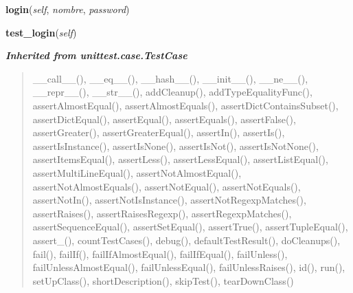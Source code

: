     \label{test:UsuarioTestCase:login}

    \vspace{0.5ex}

\hspace{.8\funcindent}\begin{boxedminipage}{\funcwidth}

    \raggedright \textbf{login}(\textit{self}, \textit{nombre}, \textit{password})

\setlength{\parskip}{2ex}
\setlength{\parskip}{1ex}
    \end{boxedminipage}

    \label{test:UsuarioTestCase:test_login}

    \vspace{0.5ex}

\hspace{.8\funcindent}\begin{boxedminipage}{\funcwidth}

    \raggedright \textbf{test\_login}(\textit{self})

\setlength{\parskip}{2ex}
\setlength{\parskip}{1ex}
    \end{boxedminipage}


\large{\textbf{\textit{Inherited from unittest.case.TestCase}}}

\begin{quote}
\_\_call\_\_(), \_\_eq\_\_(), \_\_hash\_\_(), \_\_init\_\_(), \_\_ne\_\_(), \_\_repr\_\_(), \_\_str\_\_(), addCleanup(), addTypeEqualityFunc(), assertAlmostEqual(), assertAlmostEquals(), assertDictContainsSubset(), assertDictEqual(), assertEqual(), assertEquals(), assertFalse(), assertGreater(), assertGreaterEqual(), assertIn(), assertIs(), assertIsInstance(), assertIsNone(), assertIsNot(), assertIsNotNone(), assertItemsEqual(), assertLess(), assertLessEqual(), assertListEqual(), assertMultiLineEqual(), assertNotAlmostEqual(), assertNotAlmostEquals(), assertNotEqual(), assertNotEquals(), assertNotIn(), assertNotIsInstance(), assertNotRegexpMatches(), assertRaises(), assertRaisesRegexp(), assertRegexpMatches(), assertSequenceEqual(), assertSetEqual(), assertTrue(), assertTupleEqual(), assert\_(), countTestCases(), debug(), defaultTestResult(), doCleanups(), fail(), failIf(), failIfAlmostEqual(), failIfEqual(), failUnless(), failUnlessAlmostEqual(), failUnlessEqual(), failUnlessRaises(), id(), run(), setUpClass(), shortDescription(), skipTest(), tearDownClass()
\end{quote}


